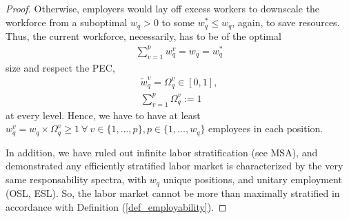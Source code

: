 \documentclass[hidelinks, nonatbib]{elsarticle}
\begin{document}
\begin{lemma}
\begin{proof}
        Otherwise, employers would lay off excess workers to downscale the workforce from a suboptimal $w_q > 0$ to some $w_{q}^{*} \leq w_q$, again, to save resources. Thus, the current workforce, necessarily, has to be of the optimal
        \begin{gather}
        \sum_{v=1}^{p}
        w_{q}^{v}
        =
        w_q
        =
        w_{q}^{*}
        \end{gather}
        size and respect the PEC,
        \begin{gather}
        \tilde{w}_{q}^{v}
        =
        \Omega_{q}^{v}
        \in
        [0,1]
        ,
        \\
        \sum_{v=1}^{p}
        \Omega_{q}^{v}
        :=
        1
        \end{gather}
        at every level. Hence, we have to have at least $w_{q}^{v} = w_q \times \Omega_{q}^{v} \geq 1 \ \forall \ v \in \{1,\dots, p\}, p \in \{1,\dots, w_q\}$ employees in each position.
        
        In addition, we have ruled out infinite labor stratification (see MSA), and demonstrated any efficiently stratified labor market is characterized by the very same responsability spectra, with $w_q$ unique positions, and unitary employment (OSL, ESL). So, the labor market cannot be more than maximally stratified in accordance with Definition (\ref{def_employability}). 
        

\end{proof}
\end{lemma}
\end{document}
